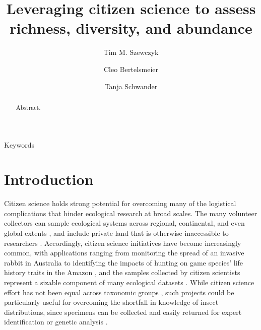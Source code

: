 \documentclass[preprint,review,times,12pt,3p]{elsarticle}
\begin{document}
\begin{frontmatter}

\title{Leveraging citizen science to assess richness, diversity, and abundance}

\author[DEE]{Tim M. Szewczyk}
\author[DEE]{Cleo Bertelsmeier}
\author[DEE]{Tanja Schwander}

\address[DEE]{Department of Ecology and Evolution, University of Lausanne}


\begin{abstract}
Abstract.
\end{abstract}

\begin{keyword}
Keywords
\end{keyword}

\end{frontmatter}
\linenumbers



\section{Introduction}
\label{S:1}

Citizen science holds strong potential for overcoming many of the logistical complications that hinder ecological research at broad scales. The many volunteer collectors can sample ecological systems across regional, continental, and even global extents \citep{Theobald2015}, and include private land that is otherwise inaccessible to researchers \citep{Pernat2020}. Accordingly, citizen science initiatives have become increasingly common, with applications ranging from monitoring the spread of an invasive rabbit in Australia \citep{Roy-Dufresne2019} to identifying the impacts of hunting on game species' life history traits in the Amazon \citep{ElBizri2020}, and the samples collected by citizen scientists represent a sizable component of many ecological datasets \citep{Poisson2020}.  While citizen science effort has not been equal across taxonomic groups \citep{Theobald2015,Troudet2017}, such projects could be particularly useful for overcoming the shortfall in knowledge of insect distributions, since specimens can be collected and easily returned for expert identification or genetic analysis \citep{Pernat2020}.
\end{document}
